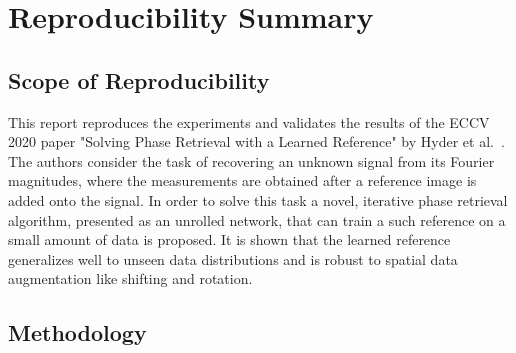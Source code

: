 

\section*{\centering Reproducibility Summary}


\subsection*{Scope of Reproducibility}


This report reproduces the experiments and validates the results of the ECCV 2020 paper "Solving Phase Retrieval with a Learned Reference" by Hyder et al.~\cite{hyder2020solving}. The authors consider the task of recovering an unknown signal from its Fourier magnitudes, where the measurements are obtained after a reference image is added onto the signal. In order to solve this task a novel, iterative phase retrieval algorithm, presented as an unrolled network, that can train a such reference on a small amount of data is proposed. It is shown that the learned reference generalizes well to unseen data distributions and is robust to spatial data augmentation like shifting and rotation.

\subsection*{Methodology}




